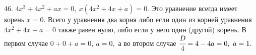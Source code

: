 46. $4x^3+4x^2+ax=0,\ x(4x^2+4x+a)=0.$ Это уравнение всегда имеет корень $x=0.$ Всего у уравнения два корня либо если один из корней уравнения $4x^2+4x+a=0$ также равен нулю, либо если у него один (другой) корень. В первом случае $0+0+a=0,\ a=0,$ а во втором случае $\cfrac{D}{4}=4-4a=0,\ a=1.$\\
